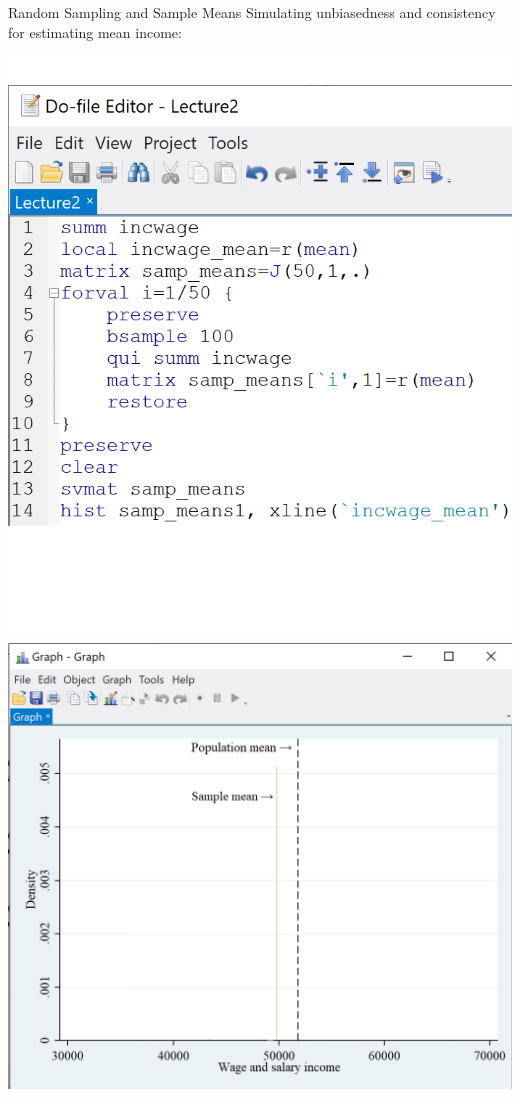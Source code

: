 \documentclass[11pt,english,handout]{beamer}
\begin{document}
\begin{frame}{Random Sampling and Sample Means}
\vspace{0.2cm}
Simulating unbiasedness and consistency for estimating mean income:

\begin{center}
\includegraphics[scale=0.45]{stata18.png} \includegraphics[scale=0.5]{stata19.png}
\end{center}

\end{frame}
\end{document}
